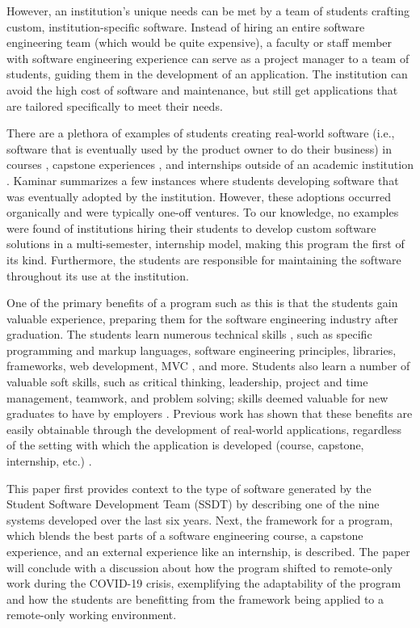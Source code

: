 However, an institution's unique needs can be met by a team of students crafting custom, institution-specific software. Instead of hiring an entire software engineering team (which would be quite expensive), a faculty or staff member with software engineering experience can serve as a project manager to a team of students, guiding them in the development of an application. The institution can avoid the high cost of software and maintenance, but still get applications that are tailored specifically to meet their needs.

There are a plethora of examples of students creating real-world software (i.e., software that is eventually used by the product owner to do their business) in courses \cite{coursevsproject, tadayon2004software}, capstone experiences \cite{keogh2007scalable, capstone}, and internships outside of an academic institution \cite{rochesterfirstundergradsoftwareteam}. Kaminar \cite{kaminer_2014} summarizes a few instances where students developing software that was eventually adopted by the institution. However, these adoptions occurred organically and were typically one-off ventures. To our knowledge, no examples were found of institutions hiring their students to develop custom software solutions in a multi-semester, internship model, making this program the first of its kind. Furthermore, the students are responsible for maintaining the software throughout its use at the institution.

One of the primary benefits of a program such as this is that the students gain valuable experience, preparing them for the software engineering industry after graduation. The students learn numerous technical skills \cite{hardskills}, such as specific programming and markup languages, software engineering principles, libraries, frameworks, web development, MVC \cite{mvc}, and more. Students also learn a number of valuable soft skills, such as critical thinking, leadership, project and time management, teamwork, and problem solving; skills deemed valuable for new graduates to have by employers \cite{lavy2013soft}. Previous work has shown that these benefits are easily obtainable through the development of real-world applications, regardless of the setting with which the application is developed (course, capstone, internship, etc.) \cite{heggen2018hiring, liu2005enriching, alzamil2005towards}.

This paper first provides context to the type of software generated by the Student Software Development Team (SSDT) by describing one of the nine systems developed over the last six years. Next, the framework for a program, which blends the best parts of a software engineering course, a capstone experience, and an external experience like an internship, is described. The paper will conclude with a discussion about how the program shifted to remote-only work during the COVID-19 crisis, exemplifying the adaptability of the program and how the students are benefitting from the framework being applied to a remote-only working environment.
